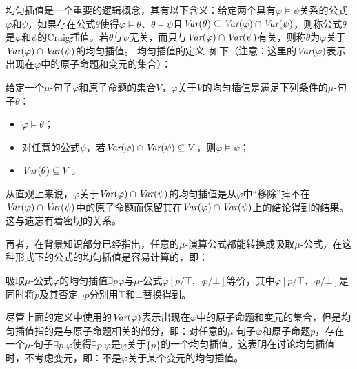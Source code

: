 均匀插值是一个重要的逻辑概念，其有以下含义：给定两个具有$\varphi\models\psi$关系的公式$\varphi$和$\psi$，如果存在公式$\theta$使得$\varphi\models \theta$、$\theta \models \psi$且$\textit{Var}(\theta) \subseteq \textit{Var}(\varphi) \cap \textit{Var}(\psi)$，则称公式$\theta$是$\varphi$和$\psi$的Craig插值。若$\theta$与$\psi$无关，而只与$\textit{Var}(\varphi) \cap \textit{Var}(\psi)$有关，则称$\theta$为$\varphi$关于$\textit{Var}(\varphi) \cap \textit{Var}(\psi)$的均匀插值。
均匀插值的定义~\cite{d2006modal}如下（注意：这里的$\textit{Var}(\varphi)$表示出现在$\varphi$中的原子命题和变元的集合）：                                                                                                                                                                                                                                              
\begin{definition}
	给定一个$\mu$-句子$\varphi$和原子命题的集合$V$，$\varphi$关于$V$的均匀插值是满足下列条件的$\mu$-句子$\theta$：
	\begin{itemize}
		\item $\varphi \models \theta$；
		\item 对任意的公式$\psi$，若$\textit{Var}(\varphi) \cap \textit{Var}(\psi)\subseteq V$，则$\varphi \models \psi$；
		\item $\textit{Var}(\theta) \subseteq V$。 
	\end{itemize}
\end{definition}


从直观上来说，$\varphi$关于$\textit{Var}(\varphi) \cap \textit{Var}(\psi)$的均匀插值是从$\varphi$中“移除”掉不在$\textit{Var}(\varphi) \cap \textit{Var}(\psi)$中的原子命题而保留其在$\textit{Var}(\varphi) \cap \textit{Var}(\psi)$上的结论得到的结果。这与遗忘有着密切的关系。

再者，在背景知识部分已经指出，任意的$\mu$-演算公式都能转换成吸取$\mu$-公式，在这种形式下的公式的均匀插值是容易计算的，即：
\begin{theorem}
	吸取$\mu$-公式$\varphi$的均匀插值$\exists p \varphi$与$\mu$-公式$\varphi[p/\top, \neg p/ \bot]$等价，其中$\varphi[p/\top, \neg p/ \bot]$是同时将$p$及其否定$\neg p$分别用$\top$和$\bot$替换得到。
\end{theorem}



尽管上面的定义中使用的$\textit{Var}(\varphi)$表示出现在$\varphi$中的原子命题和变元的集合，但是均匀插值指的是与原子命题相关的部分，即：对任意的$\mu$-句子$\varphi$和原子命题$p$，存在一个$\mu$-句子$\widetilde{\exists} p. \varphi$使得$\widetilde{\exists} p. \varphi$是$\varphi$关于$\{p\}$的一个均匀插值。这表明在讨论均匀插值时，不考虑变元，即：不是$\varphi$关于某个变元的均匀插值。%

